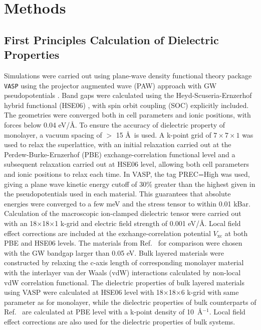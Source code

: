 \section{Methods}
\label{sec:diel-org8457dbb}

\subsection*{First Principles Calculation of Dielectric Properties}
\label{sec:first-princ-calc}

Simulations were carried out using plane-wave density functional
theory package \texttt{VASP}
\autocite{Kresse_1993_MD_liquid_metal,Kresse_1996_1,Kresse_1996_2} using
the projector augmented wave (PAW) approach with GW pseudopotentials
\autocite{Kresse_1999_pseudopotentials}. Band gaps were calculated using
the Heyd-Scuseria-Ernzerhof hybrid functional (HSE06)
\autocite{Heyd_2003_HSe,HSE_2006_erratum}, with spin orbit coupling (SOC) explicitly
included. The geometries were converged both in cell parameters and
ionic positions, with forces below 0.04 eV/\AA. To ensure the accuracy
of dielectric property of monolayer, a vacuum spacing of $>$ 15 \AA~is
used. A k-point grid of \(7\times7\times1\) was used to relax the
superlattice, with an initial relaxation carried out at the
Perdew-Burke-Ernzerhof
(PBE)\autocite{Perdew_1996_GGA,Ernzerhof_1999,Paier_2005_PBE}
exchange-correlation functional level and a subsequent relaxation
carried out at HSE06 level, allowing both cell parameters and ionic
positions to relax each time. In VASP, the tag PREC=High was used,
giving a plane wave kinetic energy cutoff of 30\% greater than the
highest given in the pseudopotentials used in each material. This
guarantees that absolute energies were converged to a few meV and the
stress tensor to within 0.01 kBar.  Calculation of the macroscopic
ion-clamped dielectric tensor were carried out with an
18$\times$18$\times$1 k-grid and electric field strength of 0.001
eV/\AA.  Local field effect corrections are included at the
exchange-correlation potential $V_{\mathrm{xc}}$ at both PBE and HSE06
levels. The materials from Ref.~\cite{Haastrup_2018_database} for comparison
were chosen with the GW bandgap larger than 0.05 eV. Bulk layered
materials were constructed by relaxing the c-axis length of
corresponding monolayer material with the interlayer van der Waals
(vdW) interactions calculated by non-local vdW correlation
functional\autocite{Lee_2010_vdFD2}.  The dielectric properties of bulk
layered materials using VASP were calculated at HSE06 level with
18$\times$18$\times$6 k-grid with same parameter as for monolayer,
while the dielectric properties of bulk counterparts of
Ref.~\cite{Haastrup_2018_database} are calculated at PBE level with a k-point
density of 10~\AA$^{-1}$. Local field effect corrections are also used
for the dielectric properties of bulk systems.



